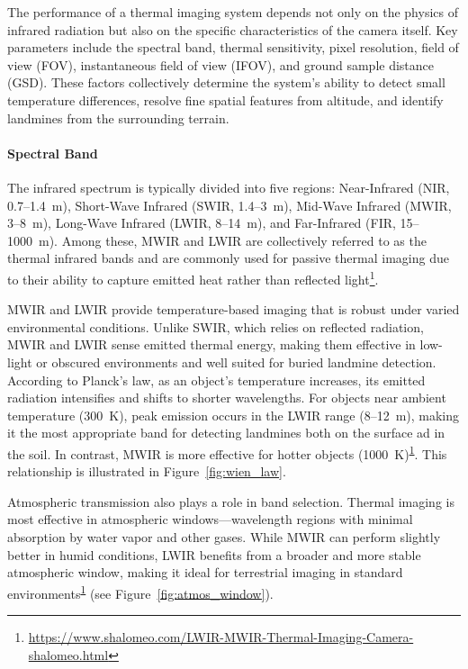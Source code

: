 The performance of a thermal imaging system depends not only on the physics of infrared radiation but also on the specific characteristics of the camera itself. Key parameters include the spectral band, thermal sensitivity, pixel resolution, field of view (FOV), instantaneous field of view (IFOV), and ground sample distance (GSD). These factors collectively determine the system’s ability to detect small temperature differences, resolve fine spatial features from altitude, and identify landmines from the surrounding terrain.


\paragraph{Spectral Band}

The infrared spectrum is typically divided into five regions: Near-Infrared (NIR, 0.7–1.4~\textmu m), Short-Wave Infrared (SWIR, 1.4–3~\textmu m), Mid-Wave Infrared (MWIR, 3–8~\textmu m), Long-Wave Infrared (LWIR, 8–14~\textmu m), and Far-Infrared (FIR, 15–1000~\textmu m). Among these, MWIR and LWIR are collectively referred to as the thermal infrared bands and are commonly used for passive thermal imaging due to their ability to capture emitted heat rather than reflected light\footnote{\label{LWIR}\url{https://www.shalomeo.com/LWIR-MWIR-Thermal-Imaging-Camera-shalomeo.html}}.

MWIR and LWIR provide temperature-based imaging that is robust under varied environmental conditions. Unlike SWIR, which relies on reflected radiation, MWIR and LWIR sense emitted thermal energy, making them effective in low-light or obscured environments and well suited for buried landmine detection. According to Planck’s law, as an object’s temperature increases, its emitted radiation intensifies and shifts to shorter wavelengths. For objects near ambient temperature (300~K), peak emission occurs in the LWIR range (8–12~\textmu m), making it the most appropriate band for detecting landmines both on the surface ad in the soil. In contrast, MWIR is more effective for hotter objects (1000~K)\textsuperscript{\ref{LWIR}}. This relationship is illustrated in Figure~\ref{fig:wien_law}.

Atmospheric transmission also plays a role in band selection. Thermal imaging is most effective in atmospheric windows—wavelength regions with minimal absorption by water vapor and other gases. While MWIR can perform slightly better in humid conditions, LWIR benefits from a broader and more stable atmospheric window, making it ideal for terrestrial imaging in standard environments\textsuperscript{\ref{LWIR}} (see Figure~\ref{fig:atmos_window}).

